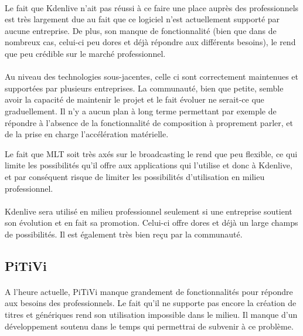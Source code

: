 \paragraph{}

Le fait que Kdenlive n'ait pas réussi à ce faire une place auprès des
professionnels est très largement due au fait que ce logiciel n'est
actuellement supporté par aucune entreprise. De plus, son manque de
fonctionnalité (bien que dans de nombreux cas, celui-ci peu dores et
déjà répondre aux différents besoins), le rend que peu crédible
sur le marché professionnel.

\paragraph{}

Au niveau des technologies sous-jacentes, celle ci sont correctement
maintenues et supportées par plusieurs entreprises. La communauté,
bien que petite, semble avoir la capacité de maintenir le projet et
le fait évoluer ne serait-ce que graduellement. Il n'y a aucun plan
à long terme permettant par exemple de répondre à l'absence de la
fonctionnalité de composition à proprement parler, et de la prise en
charge l'accélération matérielle.

Le fait que MLT soit très axés sur le broadcasting le rend que peu
flexible, ce qui limite les possibilités qu'il offre aux applications
qui l'utilise et donc à Kdenlive, et par conséquent risque de limiter
les possibilités d'utilisation en milieu professionnel.

\paragraph{}

Kdenlive sera utilisé en milieu professionnel seulement si une entreprise
soutient son évolution et en fait sa promotion. Celui-ci offre dores
et déjà un large champs de possibilités. Il est également très bien
reçu par la communauté.

\subsection {PiTiVi}

\paragraph{}

A l'heure actuelle, PiTiVi manque grandement de fonctionnalités pour
répondre aux besoins des professionnels. Le fait qu'il ne supporte
pas encore la création de titres et génériques rend son utilisation
impossible dans le milieu. Il manque d'un développement soutenu dans
le temps qui permettrai de subvenir à ce problème.

